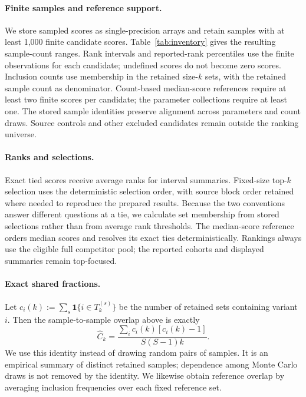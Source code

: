 \documentclass[11pt]{article}
\begin{document}
\paragraph{Finite samples and reference support.}
We store sampled scores as single-precision arrays and retain samples with at
least 1,000 finite candidate scores. Table~\ref{tab:inventory} gives the
resulting sample-count ranges. Rank intervals and reported-rank percentiles
use the finite observations for each candidate; undefined scores do not become
zero scores. Inclusion counts use membership in the retained size-$k$ sets,
with the retained sample count as denominator. Count-based median-score references
require at least two finite scores per candidate; the parameter collections
require at least one. The stored sample identities preserve alignment across
parameters and count draws. Source controls and other excluded candidates
remain outside the ranking universe.

\paragraph{Ranks and selections.}
Exact tied scores receive average ranks for interval summaries. Fixed-size
top-$k$ selection uses the deterministic selection order, with source block
order retained where needed to reproduce the prepared results. Because the
two conventions answer different questions at a tie, we calculate set
membership from stored selections rather than from average rank thresholds.
The median-score reference orders median scores and resolves its exact ties
deterministically. Rankings always use the eligible full competitor pool;
the reported cohorts and displayed summaries remain top-focused.

\paragraph{Exact shared fractions.}
Let $c_i(k):=\sum_s\mathbf{1}\{i\in T_k^{(s)}\}$ be the number of retained
sets containing variant $i$. Then the sample-to-sample overlap above is
exactly
\[
\widehat C_k=\frac{\sum_i c_i(k)[c_i(k)-1]}{S(S-1)k}.
\]
We use this identity instead of drawing random pairs of samples. It is an
empirical summary of distinct retained samples; dependence among Monte Carlo
draws is not removed by the identity. We likewise obtain reference overlap
by averaging inclusion frequencies over each fixed reference set.
\end{document}
